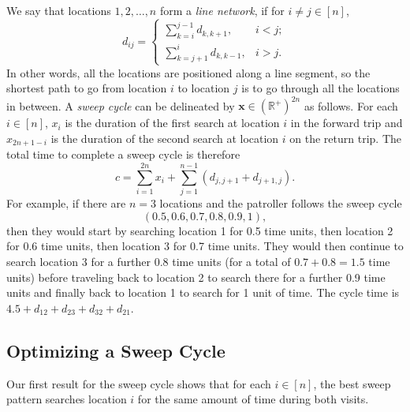 \documentclass[11pt,a4paper]{article}
\begin{document}
We say that locations $1,2, \ldots, n$ form a \textit{line network}, if for $i \neq j \in [n]$,
\[
d_{ij} = \begin{cases}
    \sum_{k=i}^{j-1} d_{k, k+1}, & i < j; \\
    \sum_{k=j+1}^{i} d_{k, k-1}, & i > j .
\end{cases}
\]
In other words, all the locations are positioned along a line segment, so the shortest path to go from location $i$ to location $j$ is to go through all the locations in between.
A \textit{sweep cycle} can be delineated by $\textbf{x} \in (\mathbb{R}^+)^{2n}$ as follows.
For each $i \in [n]$, $x_i$ is the duration of the first search at location $i$ in the forward trip and $x_{2n+1-i}$ is the duration of the second search at location $i$ on the return trip. 
The total time to complete a sweep cycle is therefore
\begin{equation}
c = \sum_{i=1}^{2n} x_i + \sum_{j=1}^{n-1} \left( d_{j,j+1} + d_{j+1,j} \right).
\label{eq:sweep cycle time v1}
\end{equation}
For example, if there are $n=3$ locations and the patroller follows the sweep cycle 
$$(0.5, 0.6, 0.7, 0.8, 0.9, 1),$$
then they would start by searching location 1 for 0.5 time units, then location 2 for 0.6 time units, then location 3 for 0.7 time units. They would then continue to search location 3 for a further 0.8 time units (for a total of $0.7+0.8=1.5$ time units) before traveling back to location 2 to search there for a further 0.9 time units and finally back to location 1 to search for 1 unit of time.
The cycle time is $4.5 + d_{12} + d_{23} + d_{32} + d_{21}$.


\subsection{Optimizing a Sweep Cycle} \label{sec: optimizing a sweep cycle}
Our first result for the sweep cycle shows that for each $i \in [n]$, the best sweep pattern searches location $i$ for the same amount of time during both visits. 
\end{document}
